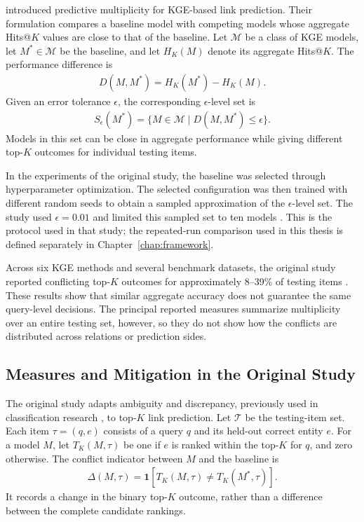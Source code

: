 \citet{zhu2024predictive} introduced predictive multiplicity for KGE-based
link prediction. Their formulation compares a baseline model with competing
models whose aggregate Hits@$K$ values are close to that of the baseline. Let
$\mathcal{M}$ be a class of KGE models, let $M^*\in\mathcal{M}$ be the
baseline, and let $H_K(M)$ denote its aggregate Hits@$K$. The performance
difference is
\begin{align}
    D(M,M^*)=H_K(M^*)-H_K(M).
\end{align}
Given an error tolerance $\epsilon$, the corresponding $\epsilon$-level set is
\begin{align}
    S_\epsilon(M^*)
    =
    \{M\in\mathcal{M}\mid D(M,M^*)\leq\epsilon\}.
\end{align}
Models in this set can be close in aggregate performance while giving different
top-$K$ outcomes for individual testing items.

In the experiments of the original study, the baseline was selected through
hyperparameter optimization. The selected configuration was then trained with
different random seeds to obtain a sampled approximation of the
$\epsilon$-level set. The study used $\epsilon=0.01$ and limited this sampled
set to ten models \citep{zhu2024predictive}. This is the protocol used in that
study; the repeated-run comparison used in this thesis is defined separately
in Chapter~\ref{chap:framework}.

Across six KGE methods and several benchmark datasets, the original study
reported conflicting top-$K$ outcomes for approximately 8--39\% of testing
items \citep{zhu2024predictive}. These results show that similar aggregate
accuracy does not guarantee the same query-level decisions. The principal
reported measures summarize multiplicity over an entire testing set, however,
so they do not show how the conflicts are distributed across relations or
prediction sides.

\subsection{Measures and Mitigation in the Original Study}

The original study adapts ambiguity and discrepancy, previously used in
classification research \citep{marx2020predictive,watsondaniels2023predictive},
to top-$K$ link prediction. Let $\mathcal{T}$ be the testing-item set. Each
item $\tau=(q,e)$ consists of a query $q$ and its held-out correct entity $e$.
For a model $M$, let $T_K(M,\tau)$ be one if $e$ is ranked within the top-$K$
for $q$, and zero otherwise. The conflict indicator between $M$ and the
baseline is
\begin{align}
    \Delta(M,\tau)
    =
    \mathbf{1}\!\left[T_K(M,\tau)\neq T_K(M^*,\tau)\right].
\end{align}
It records a change in the binary top-$K$ outcome, rather than a difference
between the complete candidate rankings.

